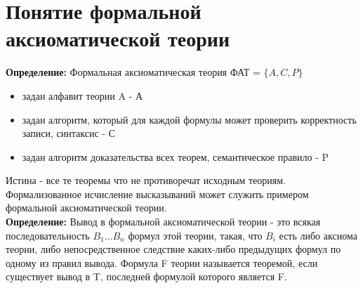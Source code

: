 \documentclass[../main.tex]{subfiles}
\begin{document}
\section{Понятие формальной аксиоматической теории}
\textbf{Определение:
} Формальная аксиоматическая теория ФАТ = $\{A,C,P\}$
\begin{itemize}
	\item задан алфавит теории A - А
	\item задан алгоритм, который для каждой формулы может проверить корректность записи, синтаксис - С
	\item задан алгоритм доказательства всех теорем, семантическое правило - P
\end{itemize}
Истина - все те теоремы что не противоречат исходным теориям.
Формализованное исчисление высказываний может служить примером формальной аксиоматической теории. \\
\textbf{Определение:
} Вывод в формальной аксиоматической теории - это всякая последовательность $B_1 \ldots B_n$ формул этой теории, такая, что $B_i$ есть либо аксиома теории, либо непосредственное следствие каких-либо предыдущих формул по одному из правил вывода. Формула F теории называется теоремой, если существует вывод в T, последней формулой которого является F.
\end{document}
